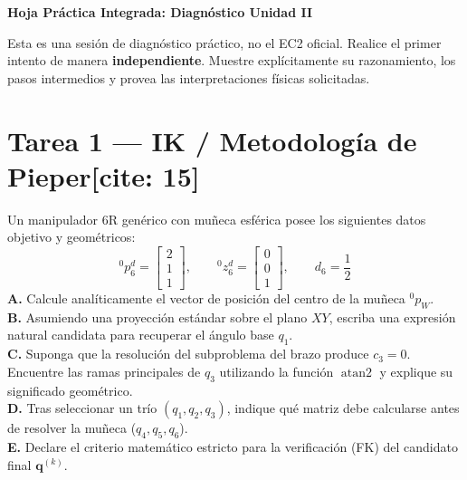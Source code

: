 \documentclass[11pt, a4paper]{article}
\begin{document}
\begin{center}
    \Large\textbf{\textcolor{ucbblue}{Hoja Práctica Integrada: Diagnóstico Unidad II}}\\[0.2cm]
\end{center}

\begin{tcolorbox}[colback=gray!5, colframe=gray!50, title=\textbf{Instrucciones{[cite: 15]}}]
    Esta es una sesión de diagnóstico práctico, no el EC2 oficial. Realice el primer intento de manera \textbf{independiente}. Muestre explícitamente su razonamiento, los pasos intermedios y provea las interpretaciones físicas solicitadas.
\end{tcolorbox}

\section*{Tarea 1 — IK / Metodología de Pieper[cite: 15]}
Un manipulador 6R genérico con muñeca esférica posee los siguientes datos objetivo y geométricos:
\begin{equation*}
    {}^0p_6^d = \begin{bmatrix} 2 \\ 1 \\ 1 \end{bmatrix}, \qquad {}^0z_6^d = \begin{bmatrix} 0 \\ 0 \\ 1 \end{bmatrix}, \qquad d_6 = \frac{1}{2}
\end{equation*}
\textbf{A.} Calcule analíticamente el vector de posición del centro de la muñeca ${}^0p_W$.\\
\textbf{B.} Asumiendo una proyección estándar sobre el plano $XY$, escriba una expresión natural candidata para recuperar el ángulo base $q_1$.\\
\textbf{C.} Suponga que la resolución del subproblema del brazo produce $c_3 = 0$. Encuentre las ramas principales de $q_3$ utilizando la función $\operatorname{atan2}$ y explique su significado geométrico.\\
\textbf{D.} Tras seleccionar un trío $(q_1, q_2, q_3)$, indique qué matriz debe calcularse antes de resolver la muñeca ($q_4, q_5, q_6$).\\
\textbf{E.} Declare el criterio matemático estricto para la verificación (FK) del candidato final $\mathbf{q}^{(k)}$.
\end{document}
